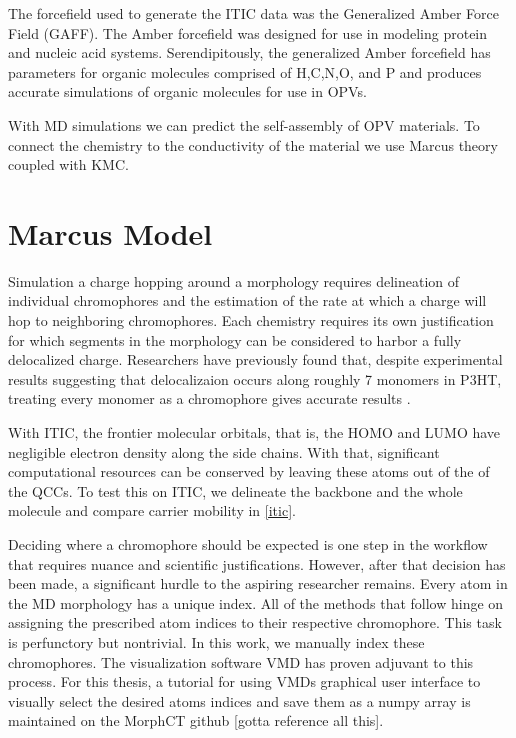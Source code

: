 The forcefield used to generate the ITIC data was the Generalized
Amber Force Field (GAFF)\cite{Wang2004a}.
The Amber forcefield was designed for use in modeling protein and
nucleic acid systems. Serendipitously, the generalized Amber forcefield has parameters for organic molecules
comprised of H,C,N,O, and P and produces accurate simulations of organic molecules for use in OPVs. 

With MD simulations we can predict the self-assembly of OPV materials. To connect the chemistry to the
conductivity of the material we use Marcus theory coupled with KMC.

\section{Marcus Model}
\label{marcusmodel}

Simulation a charge hopping around a morphology requires delineation of
individual chromophores and the estimation of the rate at which a charge will hop to neighboring
chromophores. Each chemistry requires its own justification for which segments in the morphology
can be considered to harbor a fully delocalized charge. Researchers have previously found that, 
despite experimental
results suggesting that delocalizaion occurs along roughly 7 monomers in P3HT, treating every monomer as a
chromophore gives accurate results \cite{jones2017}.

With ITIC, the frontier molecular orbitals, that is, the HOMO
and LUMO have negligible electron density along the side chains. With that, significant computational resources
can be conserved by leaving these atoms out of the of the QCCs. To test this on ITIC, we delineate the
backbone and the whole molecule and compare carrier mobility in \autoref{itic}. 

Deciding where a chromophore should be expected is one step in the workflow that requires nuance and
scientific justifications. However, after that decision has been made, a significant hurdle to the aspiring
researcher remains. Every atom in the MD morphology has a unique index. All of the methods that follow hinge
on assigning the prescribed atom indices to their respective chromophore. This task is perfunctory
but nontrivial. In this work, we manually index these chromophores. The visualization software VMD has proven
adjuvant to this process. For this thesis, a tutorial for using VMDs graphical user interface to visually select the desired
atoms indices and save them as a numpy array is maintained on the MorphCT github [gotta reference all this]. 


